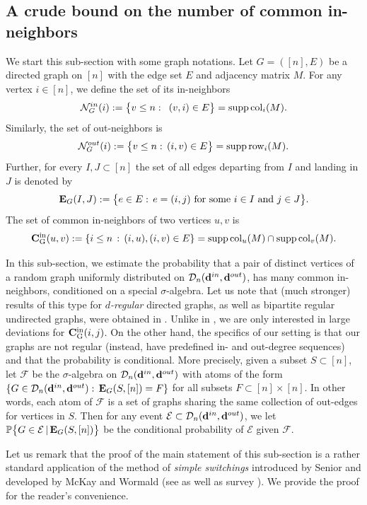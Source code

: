 \documentclass[12pt]{article}
\theoremstyle{definition}
\theoremstyle{plain}
\newcommand{\supp}{{\rm supp\,}}
\newcommand{\Event}{\mathcal{E}}
\def\nrangr{G}
\def\inco{{\rm {\bf C}_{\nrangr}^{in}}}
\def\innbr{{\mathcal N}_{\nrangr}^{in}}
\def\outnbr{{\mathcal N}_{\nrangr}^{out}}
\def\edg{{\bf E}_{\nrangr}}
\def\Prob{{\mathbb P}}
\def\InDeg{{\bf d}^{in}}
\def\OutDeg{{\bf d}^{out}}
\def\DGraphSet{{\mathcal D}_n}
\def\Col{{\rm col}}
\def\Row{{\rm row}}
\begin{document}
\subsection{A crude bound on the number of common in-neighbors}\label{sec-graph}

We start this sub-section with some graph notations.
Let
$\nrangr=([n],E)$ be a directed graph on $[n]$ with the edge set $E$ and adjacency matrix $M$.
For any vertex $i\in[n]$, we define the set of its in-neighbors
\begin{align*}
\innbr(i):=\bigl\{v\leq n:\, \, \, (v,i) \in E\bigr\}=\supp \Col_i(M).
\end{align*}
Similarly, the set of out-neighbors is
\begin{align*}
\outnbr(i):=\bigl\{v\leq n:\,  (i,v) \in E\bigr\}=\supp \Row_i(M).
\end{align*}
Further, for every $I,J\subset [n]$
the set of all edges departing from $I$ and landing in $J$ is denoted by
$$
 \edg(I,J):=\bigl\{ e\in E:\, e=(i,j) \text{ for some } i\in I \text{ and } j\in J\bigr\}.
$$
The set of common in-neighbors of two vertices $u,v$ is
$$
\inco(u, v):=\{i\leq n \, :\, (i, u), (i, v)\in E\} = \supp \Col_u(M) \cap \supp \Col_v(M).
$$

In this sub-section, we estimate the probability that a pair of distinct vertices of a random graph
uniformly distributed on $\DGraphSet(\InDeg,\OutDeg)$,
has many common in-neighbors, conditioned on a special $\sigma$-algebra.
Let us note that (much stronger) results of this type for {\it $d$-regular} directed graphs,
as well as bipartite regular undirected graphs, were obtained in \cite{Cook RSA}.
Unlike in \cite{Cook RSA}, we are only interested in large deviations for $\inco(i,j)$.
On the other hand, the specifics of our setting is that our graphs are not regular (instead, have predefined in- and out-degree
sequences) and that the probability is conditional.
More precisely, given a subset $S\subset [n]$,
let $\mathcal F$ be the $\sigma$-algebra on $\DGraphSet(\InDeg,\OutDeg)$
with atoms of the form $\{\nrangr\in\DGraphSet(\InDeg,\OutDeg):\,\edg( S, [n])=F\}$
for all subsets $F\subset [n]\times[n]$. In other words, each atom of $\mathcal F$
is a set of graphs sharing the same collection of out-edges for vertices in $S$.
Then for any event $\Event\subset \DGraphSet(\InDeg,\OutDeg)$,
we let
$\Prob\big\{\nrangr\in\Event \,|\,\edg( S, [n])\big\}$
be the conditional probability of $\Event$ given $\mathcal F$.

Let us remark that the proof of the main statement of this sub-section
is a rather standard application of the method of {\it simple switchings}
introduced by Senior \cite{Senior}
and developed by McKay and Wormald (see \cite{McKay} as well as survey \cite{Wormald}).
We provide the proof for the reader's convenience.
\end{document}
